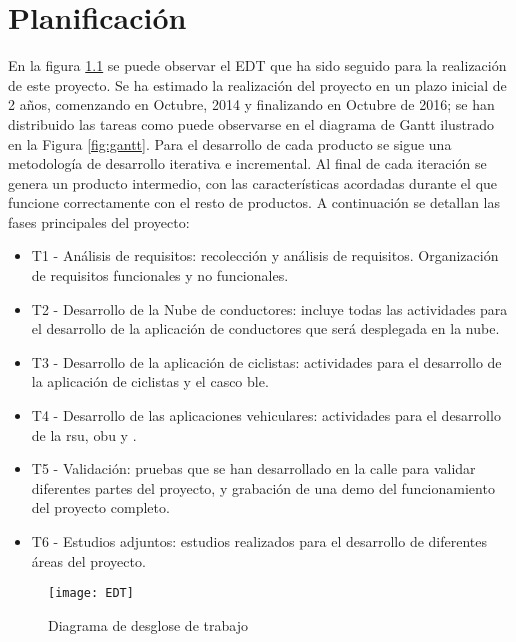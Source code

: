 \chapter{Planificación}
En la figura \ref{fig:edt} se puede observar el EDT que ha sido seguido para la
realización de este proyecto. Se ha estimado la realización del proyecto en un
plazo inicial de 2 años, comenzando en Octubre, 2014 y finalizando en Octubre de
2016; se han distribuido las tareas como puede observarse en el diagrama de
Gantt ilustrado en la Figura \ref{fig:gantt}. Para el desarrollo de cada
producto se sigue una metodología de desarrollo iterativa e incremental. Al
final de cada iteración se genera un producto intermedio, con las
características acordadas durante el que funcione correctamente con el resto de
productos.  A continuación se detallan las fases principales del proyecto:
\begin{itemize}
	\item T1 - Análisis de requisitos: recolección y análisis de requisitos.
	Organización de requisitos funcionales y no funcionales.

	\item T2 - Desarrollo de la Nube de conductores: incluye todas las actividades
	para el	desarrollo de la aplicación de conductores que será desplegada en la
	nube.

	\item T3 - Desarrollo de la aplicación de ciclistas: actividades para el
	desarrollo 	de la aplicación de ciclistas y el casco \gls{ble}.

	\item T4 - Desarrollo de las aplicaciones vehiculares: actividades para el
	desarrollo de la \gls{rsu}, \gls{obu} y .

	\item T5 - Validación: pruebas que se han desarrollado en la calle para
	validar diferentes partes del proyecto, y grabación de una demo del
	funcionamiento del proyecto completo.

	\item T6 - Estudios adjuntos: estudios realizados para el desarrollo de
	diferentes áreas del proyecto.
\end{itemize}

\begin{figure}[t]
	\begin{center}
		 {
			\texttt{[image: EDT]}
		}
		\caption{Diagrama de desglose de trabajo}
		\label{fig:edt}
	\end{center}
\end{figure}

